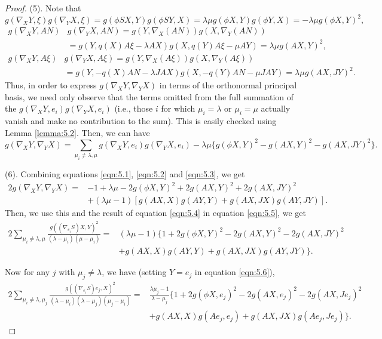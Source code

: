 \documentclass[reqno]{amsart}%
\theoremstyle{definition}
\numberwithin{equation}{section}
\begin{document}
\begin{proof}
(5). Note that
$$
g(\nabla_X Y,\xi)g(\nabla_Y X,\xi)=g(\phi SX,Y)g(\phi SY,X)=\lambda\mu g(\phi X,Y)g(\phi Y,X)=-\lambda\mu g(\phi X,Y)^2,
$$
$$
\begin{aligned}
g(\nabla_X Y,AN)&g(\nabla_Y X,AN)=g(Y,\nabla_X (AN))g(X,\nabla_Y (AN))\\
&=g(Y,q(X)A\xi-\lambda AX)g(X,q(Y)A\xi-\mu AY)
=\lambda\mu g(AX,Y)^2,
\end{aligned}
$$
$$
\begin{aligned}
g(\nabla_X Y,A\xi)&g(\nabla_Y X,A\xi)=g(Y,\nabla_X (A\xi))g(X,\nabla_Y (A\xi))\\
&=g(Y,-q(X)AN-\lambda JAX)g(X,-q(Y)AN-\mu JAY)=\lambda\mu g(AX,JY)^2.
\end{aligned}
$$
Thus, in order to express $g(\nabla_X Y,\nabla_Y X)$ in terms of the orthonormal principal basis,
we need only observe that the terms omitted from the full summation of
the $g(\nabla_X Y,e_i)g(\nabla_Y X,e_i)$ (i.e., those $i$ for which $\mu_i=\lambda$ or $\mu_i=\mu$
actually vanish and make no contribution to the sum). This is easily checked using Lemma \ref{lemma:5.2}.
Then, we can have
%
\begin{equation}\label{eqn:5.5}
g(\nabla_X Y,\nabla_Y X)=\sum_{\mu_i\neq\lambda,\mu}g(\nabla_X Y,e_i)g(\nabla_Y X,e_i)
-\lambda\mu\Big\{g(\phi X,Y)^2-g(AX,Y)^2-g(AX,JY)^2\Big\}.
\end{equation}

(6). Combining equations \eqref{eqn:5.1}, \eqref{eqn:5.2} and \eqref{eqn:5.3}, we get
$$
\begin{aligned}
2g(\nabla_X Y,\nabla_Y X)=&-1+\lambda\mu-2g(\phi X,Y)^2+2g(AX,Y)^2+2g(AX,JY)^2\\
&+(\lambda\mu-1)[g(AX,X)g(AY,Y)+g(AX,JX)g(AY,JY)].
\end{aligned}
$$
Then, we use this and the result of equation \eqref{eqn:5.4} in equation \eqref{eqn:5.5}, we get
%
\begin{equation}\label{eqn:5.6}
\begin{aligned}
2\sum_{\mu_i\neq\lambda,\mu}\frac{g((\nabla_{e_i} S)X,Y)^2}{(\lambda-\mu_i)(\mu-\mu_i)}
=&(\lambda\mu-1)\Big\{1+2g(\phi X,Y)^2-2g(AX,Y)^2-2g(AX,JY)^2\\
&   +g(AX,X)g(AY,Y)+g(AX,JX)g(AY,JY)\Big\}.
\end{aligned}
\end{equation}

Now for any $j$ with $\mu_j\neq\lambda$, we have (setting $Y=e_j$ in equation \eqref{eqn:5.6}),
%
\begin{equation}\label{eqn:5.7}
\begin{aligned}
2\sum_{\mu_i\neq\lambda,\mu_j}\frac{g((\nabla_{e_i} S)e_j,X)^2}{(\lambda-\mu_i)(\lambda-\mu_j)(\mu_j-\mu_i)}
=&\frac{\lambda\mu_j-1}{\lambda-\mu_j}\Big\{1+2g(\phi X,e_j)^2-2g(AX,e_j)^2-2g(AX,Je_j)^2\\
&   +g(AX,X)g(Ae_j,e_j)+g(AX,JX)g(Ae_j,Je_j)\Big\}.
\end{aligned}
\end{equation}


\end{proof}
\end{document}
